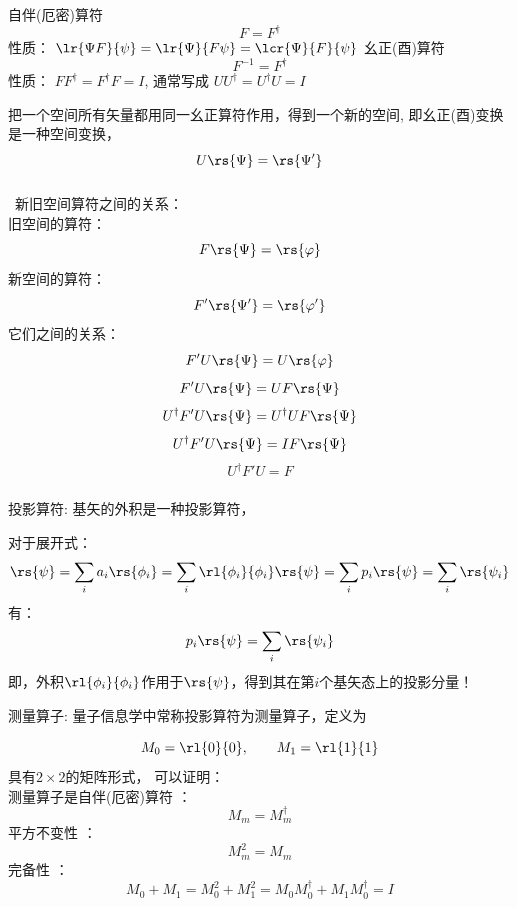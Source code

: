 \begin{frame}
    \frametitle{}
    \begin{itemize}
        \Item 自伴(厄密)算符  \[F = F^{\dagger} \] 性质： $\lr{\Psi F}{\psi}=\lr{\Psi }{F \psi}=\lcr{\Psi }{F} {\psi}$
        \Item 幺正(酉)算符    \[F^{-1} = F^{\dagger} \] 性质： $FF^{\dagger}=F^{\dagger}F=I$, 通常写成 $UU^{\dagger}=U^{\dagger}U=I$ \\ \vspace{1.0em}
    \end{itemize}        
    \Tips 把一个空间所有矢量都用同一幺正算符作用，得到一个新的空间, 即幺正(酉)变换是一种空间变换，
        \[U\rs{\Psi} =\rs{\Psi'}\]
\end{frame} 
\begin{frame}
    \frametitle{}
    {\Bullet}~新旧空间算符之间的关系： \\
        旧空间的算符： \[F \rs{\Psi}=\rs{\varphi}\]
        新空间的算符： \[F' \rs{\Psi'}=\rs{\varphi'}\]
        它们之间的关系：
        \[F' U\rs{\Psi}=U\rs{\varphi}\]
        \[F' U\rs{\Psi}=UF \rs{\Psi}\]
        \[U^{\dagger}F' U\rs{\Psi}=U^{\dagger}UF \rs{\Psi}\]
        \[U^{\dagger}F' U\rs{\Psi}=IF \rs{\Psi}\]
        \[U^{\dagger}F' U=F \]
\end{frame}

\begin{frame}
    \frametitle{}
    \begin{itemize}
    \Item 投影算符: 基矢的外积是一种投影算符，
    \end{itemize}
    对于展开式： 
    \[\rs{\psi}=\sum_i a_i \rs{\phi_i}=\sum_i \rl{\phi_i}{\phi_i} \rs{\psi}=\sum_i p_i \rs{\psi} =\sum_i \rs{\psi_i}\]
    有：\[p_i \rs{\psi} =\sum_i \rs{\psi_i}\]
    即，外积$\rl{\phi_i}{\phi_i}$作用于$\rs{\psi}$，得到其在第$i$个基矢态上的投影分量！\\
\end{frame}

\begin{frame}    
    \begin{itemize}
        \Item 测量算子: 量子信息学中常称投影算符为测量算子，定义为
        \end{itemize}
    \[M_0=\rl{0}{0}, \qquad M_1=\rl{1}{1} \]
    具有$2\times 2$的矩阵形式，
    可以证明：\\
    {\bullet} 测量算子是自伴(厄密)算符 ：\[M_m = M_m ^{\dagger} \]
    {\bullet} 平方不变性 ：\[M_m ^2 = M_m \]
    {\bullet} 完备性 ：\[M_0 + M_1 = M_0 ^2 + M_1 ^2 = M_0 M_0 ^\dagger + M_1 M_0 ^\dagger=I\]
\end{frame}

